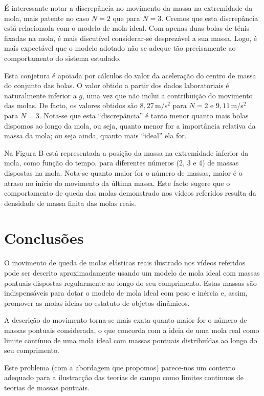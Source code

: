 \documentclass{article}
\begin{document}
É interessante notar a discrepância no movimento da massa na extremidade
da mola, mais patente no caso $N=2$ que para $N=3$. Cremos que esta discrepância
está relacionada com o modelo de mola ideal. Com apenas duas bolas de ténis
fixadas na mola, é mais discutível considerar-se desprezável a sua massa. Logo,
é mais expectável que o modelo adotado não se adeque tão precisamente ao
comportamento do sistema estudado.

Esta conjetura é apoiada por cálculos do valor da aceleração do centro de massa
do conjunto das bolas. O valor obtido a partir dos dados laboratoriais é
naturalmente inferior a $g$, uma vez que não inclui a contribuição do movimento
das molas. De facto, os valores obtidos são $8,27$\,m/s$^2$ para $N=2$ e
$9,11$\,m/s$^2$ para $N=3$.  Nota-se que esta ``discrepância'' é tanto menor
quanto mais bolas dispomos ao longo da mola, ou seja, quanto menor for a
importância relativa da massa da mola; ou seja ainda, quanto mais ``ideal'' ela
for.


Na Figura B está representada a posição da massa na extremidade inferior da
mola, como função do tempo, para diferentes números (2, 3 e 4) de massas
dispostas na mola. Nota-se quanto maior for o número de massas, maior é o
atraso no início do movimento da última massa. Este facto sugere que o
comportamento de queda das molas demonstrado nos vídeos referidos resulta da
densidade de massa finita das molas reais.

\section*{Conclusões}
O movimento de queda de molas elásticas reais ilustrado nos vídeos referidos
pode ser descrito aproximadamente usando um modelo de mola ideal com massas
pontuais dispostas regularmente ao longo do seu comprimento. Estas massas são
indispensáveis para dotar o modelo de mola ideal com peso e inércia e, assim,
promover as molas ideias ao estatuto de objetos dinâmicos.

A descrição do movimento torna-se mais exata quanto maior for o número de massas
pontuais considerada, o que concorda com a ideia de uma mola real como limite
contínuo de uma mola ideal com massas pontuais distribuídas ao longo do seu
comprimento. 

Este problema (com a abordagem que propomos) parece-nos um contexto adequado para
a ilustracção das teorias de campo como limites continuos de teorias de massas
pontuais.

\begin{figure}[b]
  \caption{\label{fig:a}}
\end{figure}
\begin{thebibliography}{99}
   { }
\end{thebibliography}
\end{document}
